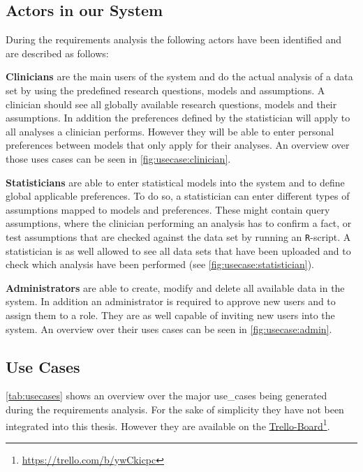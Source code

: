 \subsection{Actors in our System}
\label{sub:sassoon:actors}
During the requirements analysis the following actors have been identified and are described as follows:

\textbf{Clinicians} are the main users of the system and do the actual analysis of a data set by using the predefined research questions, models and assumptions. A clinician should see all globally available research questions, models and their assumptions. In addition the preferences defined by the statistician will apply to all analyses a clinician performs. However they will be able to enter personal preferences between models that only apply for their analyses. An overview over those uses cases can be seen in \autoref{fig:usecase:clinician}.

\textbf{Statisticians} are able to enter statistical models into the system and to define global applicable preferences. To do so, a statistician can enter different types of assumptions mapped to models and preferences. These might contain query assumptions, where the clinician performing an analysis has to confirm a fact, or test assumptions that are checked against the data set by running an \texttt{R}-script. A statistician is as well allowed to see all data sets that have been uploaded and to check which analysis have been performed (see \autoref{fig:usecase:statistician}).



\textbf{Administrators} are able to create, modify and delete all available data in the system. In addition an administrator is required to approve new users and to assign them to a role. They are as well capable of inviting new users into the system. An overview over their uses cases can be seen in \autoref{fig:usecase:admin}.





\subsection{Use Cases}
\label{sub:use_cases}
\autoref{tab:usecases} shows an overview over the major \glspl{use_case} being generated during the requirements analysis. For the sake of simplicity they have not been integrated into this thesis. However they are available on the \href{https://trello.com/b/ywCkicpc}{Trello-Board}\footnote{\url{https://trello.com/b/ywCkicpc}}.

